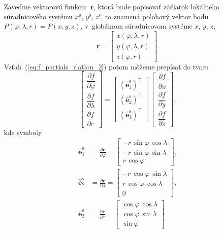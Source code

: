 \documentclass[a4paper,12pt]{book}
\let\vec\mathbf
\begin{document}
Zaveďme vektorovú funkciu~$\vec r$, ktorá bude popisovať začiatok lokálneho 
súradnicového systému $x^\mathrm{s}$, $y^\mathrm{s}$, $z^\mathrm{s}$, to 
znamená polohový vektor bodu~$P(\varphi, \lambda, r) = P(x, y, z)$, v~globálnom 
súradnicovom systéme $x$, $y$, $z$,
%
\begin{equation}
\vec r =
%
\begin{bmatrix}
x(\varphi, \lambda, r)\\
y(\varphi, \lambda, r)\\
z(\varphi, r)
\end{bmatrix}
%
{.}
\end{equation}
%
Vzťah~(\ref{eq:f_partials_rlatlon_2}) potom môžeme prepísať do tvaru
%
\begin{equation}
\label{eq:grad_cart2sph}
\begin{bmatrix}
\dfrac{\partial f}{\partial \varphi}\\[2ex]
\dfrac{\partial f}{\partial \lambda}\\[2ex]
\dfrac{\partial f}{\partial r}
\end{bmatrix}
%
=
%
\begin{bmatrix}
\left( \hat{\vec e}_1^\mathrm{s} \right)^\top\\
\left( \hat{\vec e}_2^\mathrm{s} \right)^\top\\
\left( \hat{\vec e}_3^\mathrm{s} \right)^\top
\end{bmatrix}
%
\,
%
\begin{bmatrix}
\dfrac{\partial f}{\partial x}\\[2ex]
\dfrac{\partial f}{\partial y}\\[2ex]
\dfrac{\partial f}{\partial z}
\end{bmatrix}
%
{,}
\end{equation}
%
kde symboly
%
\begin{equation}
\label{eq:er_elat_elon}
\begin{split}
\hat{\vec e}_1^\mathrm{s} &= \frac{\partial \vec r}{\partial \varphi} = 
%
\begin{bmatrix}
-r \, \sin\varphi \, \cos\lambda\\
-r \, \sin\varphi \, \sin\lambda\\
r \, \cos\varphi
\end{bmatrix}
%
{,}\\
%
\hat{\vec e}_2^\mathrm{s} &= \frac{\partial \vec r}{\partial \lambda} = 
%
\begin{bmatrix}
-r \, \cos\varphi \, \sin\lambda\\
r \, \cos\varphi \, \cos\lambda\\
0
\end{bmatrix}
%
{,}\\
%
\hat{\vec e}_3^\mathrm{s} &= \frac{\partial \vec r}{\partial r} = 
%
\begin{bmatrix}
\cos\varphi \, \cos\lambda\\
\cos\varphi \, \sin\lambda\\
\sin\varphi
\end{bmatrix}
%
\end{split}
\end{equation}
\end{document}
